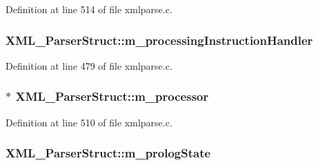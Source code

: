 Definition at line 514 of file xmlparse.\+c.

\subsubsection[{\texorpdfstring{m\+\_\+processing\+Instruction\+Handler}{m_processingInstructionHandler}}]{ X\+M\+L\+\_\+\+Parser\+Struct\+::m\+\_\+processing\+Instruction\+Handler}\hypertarget{struct_x_m_l___parser_struct_adf3617fbf15fbfaba11fce4fbf7a0e5a}{}\label{struct_x_m_l___parser_struct_adf3617fbf15fbfaba11fce4fbf7a0e5a}


Definition at line 479 of file xmlparse.\+c.

\subsubsection[{\texorpdfstring{m\+\_\+processor}{m_processor}}]{$\ast$ X\+M\+L\+\_\+\+Parser\+Struct\+::m\+\_\+processor}\hypertarget{struct_x_m_l___parser_struct_ab1e442efae09f2a9569839d1a7e8beac}{}\label{struct_x_m_l___parser_struct_ab1e442efae09f2a9569839d1a7e8beac}


Definition at line 510 of file xmlparse.\+c.

\subsubsection[{\texorpdfstring{m\+\_\+prolog\+State}{m_prologState}}]{ X\+M\+L\+\_\+\+Parser\+Struct\+::m\+\_\+prolog\+State}\hypertarget{struct_x_m_l___parser_struct_ae497d6f82f3d625a868026574a4be9dd}{}\label{struct_x_m_l___parser_struct_ae497d6f82f3d625a868026574a4be9dd}


